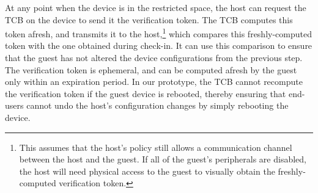\begin{mylist}
At any point when the device is in the restricted space, the host can request
the TCB on the device to send it the verification token. The TCB computes this
token afresh, and transmits it to the host,\footnote{This assumes that the
host's policy still allows a communication channel between the host and the
guest. If all of the guest's peripherals are disabled, the host will need
physical access to the guest to visually obtain the freshly-computed
verification token.} which compares this freshly-computed token with the one
obtained during check-in. It can use this comparison to ensure that the guest
has not altered the device configurations from the previous step.  The
verification token is ephemeral, and can be computed afresh by the guest only
within an expiration period.  In our prototype, the TCB cannot recompute the
verification token if the guest device is rebooted, thereby ensuring that
end-users cannot undo the host's configuration changes by simply rebooting the
device.
%
\end{mylist}

